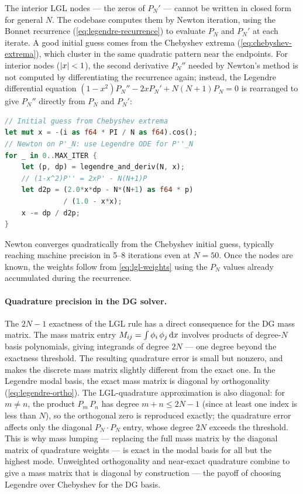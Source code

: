 The interior LGL nodes --- the zeros of $P_N'$ --- cannot be written
in closed form for general $N$.  The codebase computes them by Newton
iteration, using the Bonnet recurrence
(\cref{eq:legendre-recurrence}) to evaluate $P_N$ and $P_N'$ at each
iterate.  A good initial guess comes from the Chebyshev extrema
(\cref{eq:chebyshev-extrema}), which cluster in the same quadratic
pattern near the endpoints.  For interior nodes ($\left\lvert x \right\rvert < 1$), the
second derivative $P_N''$ needed by Newton's method is not computed by
differentiating the recurrence again; instead, the Legendre
differential equation $(1-x^2)P_N'' - 2xP_N' + N(N+1)P_N = 0$ is
rearranged to give $P_N''$ directly from $P_N$ and $P_N'$:
%
\begin{lstlisting}[language=Rust]
// Initial guess from Chebyshev extrema
let mut x = -(i as f64 * PI / N as f64).cos();
// Newton on P'_N: use Legendre ODE for P''_N
for _ in 0..MAX_ITER {
    let (p, dp) = legendre_and_deriv(N, x);
    // (1-x^2)P'' = 2xP' - N(N+1)P
    let d2p = (2.0*x*dp - N*(N+1) as f64 * p)
              / (1.0 - x*x);
    x -= dp / d2p;
}
\end{lstlisting}
%
Newton converges quadratically from the Chebyshev initial guess,
typically reaching machine precision in 5--8 iterations even at
$N = 50$.  Once the nodes are known, the weights follow from
\cref{eq:lgl-weights} using the $P_N$ values already accumulated
during the recurrence.

\paragraph{Quadrature precision in the DG solver.}

The $2N - 1$ exactness of the LGL rule has a direct consequence for
the DG mass matrix.  The mass matrix entry
$M_{ij} = \int \phi_i\,\phi_j\,\mathrm{d} x$ involves products of degree-$N$
basis polynomials, giving integrands of degree $2N$ --- one degree
beyond the exactness threshold.  The resulting quadrature error is
small but nonzero, and makes the discrete mass matrix slightly
different from the exact one.  In the Legendre modal basis, the exact
mass matrix is diagonal by orthogonality (\cref{eq:legendre-ortho}).
The LGL-quadrature approximation is also diagonal: for $m \neq n$,
the product $P_m\,P_n$ has degree $m + n \leq 2N - 1$ (since at
least one index is less than $N$), so the orthogonal zero is
reproduced exactly; the quadrature error affects only the diagonal
$P_N \cdot P_N$ entry, whose degree $2N$ exceeds the threshold.
This is why mass lumping --- replacing the full mass matrix by the
diagonal matrix of quadrature weights --- is exact in the modal
basis for all but the highest mode.  Unweighted orthogonality and
near-exact quadrature combine to give a mass matrix that is diagonal
by construction --- the payoff of choosing Legendre over Chebyshev
for the DG basis.
